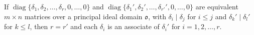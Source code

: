 If $\operatorname{diag}\{\delta_1, \delta_2, \ldots, \delta_r, 0, \ldots, 0\}$ and $\operatorname{diag}\{\delta_1', \delta_2', \ldots, \delta_{r'}', 0, \ldots, 0\}$ are equivalent $m \times n$ matrices over a principal ideal domain $\mathfrak{o}$, with $\delta_i \mid \delta_j$ for $i \leq j$ and $\delta_k' \mid \delta_l'$ for $k \leq l$, then $r = r'$ and each $\delta_i$ is an associate of $\delta_i'$ for $i = 1, 2, \ldots, r$.

